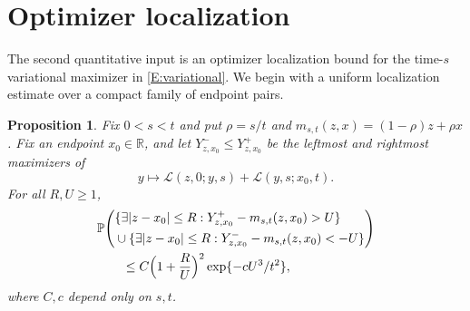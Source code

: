 \documentclass[12pt, reqno]{amsart}
\numberwithin{equation}{section}
\newtheorem{proposition}[theorem]{Proposition}
\theoremstyle{definition}
\newcommand{\R}{\mathbb{R}}
\newcommand{\Prob}{\mathbb{P}}
\newcommand{\Lcal}{\mathcal{L}}
\begin{document}
\section{Optimizer localization}
\label{S:localization}

The second quantitative input is an optimizer localization bound for the
time-$s$ variational maximizer in \eqref{E:variational}. We begin with a
uniform localization estimate over a compact family of endpoint pairs. 


\begin{proposition}\label{L:compact-family-split-localization}
  Fix $0<s<t$ and put $\rho=s/t$ and $m_{s,t}(z,x)=(1-\rho)z+\rho x$.  Fix an
  endpoint $x_0\in\R$, and let $Y^-_{z,x_0}\le Y^+_{z,x_0}$ be the leftmost and
  rightmost maximizers of
  \[
    y\mapsto \Lcal(z,0;y,s)+\Lcal(y,s;x_0,t).
  \]
  For all $R,U\ge1$,
  \begin{align}
    &\Prob\Bigg(
      \begin{aligned}
      &\{\exists |z-x_0|\le R:
        Y^+_{z,x_0}-m_{s,t}(z,x_0)>U\}\\
      &{}\cup\{\exists |z-x_0|\le R:
        Y^-_{z,x_0}-m_{s,t}(z,x_0)<-U\}
      \end{aligned}
    \Bigg)\notag\\
    &\qquad \le
    C\Big(1+\frac{R}{U}\Big)^2\exp\{-cU^3/t^2\},
    \label{E:compact-family-split-localization}
  \end{align}
  where $C,c$ depend only on $s,t$.
\end{proposition}
\end{document}
